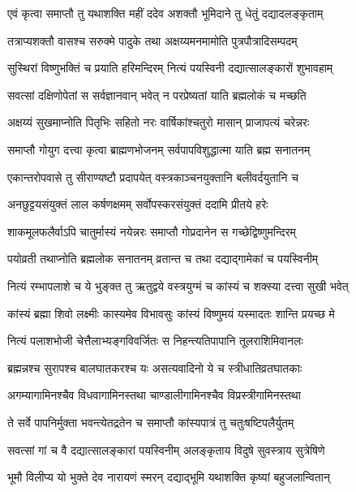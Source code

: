 \twolineshloka
{एवं कृत्वा समाप्तौ तु यथाशक्ति महीं ददेव}
{अशक्तौ भूमिदाने तु धेतुं दद्यादलङ्कृताम्} %

\twolineshloka
{तत्राप्यशक्तौ वासश्च सरुक्मे पादुके तथा}
{अक्षय्यमनमामोति पुत्रपौत्रादिसम्पदम्} %

\twolineshloka
{सुस्थिरां विष्णुभक्तिं च प्रयाति हरिमन्दिरम्}
{नित्यं पयस्विनी दद्यात्सालङ्कारों शुभावहाम्} %

\twolineshloka
{सवत्सां दक्षिणोपेतां स सर्वज्ञानवान् भवेत्}
{न परप्रेष्यतां याति ब्रह्मलोकं च मच्छति} %

\twolineshloka
{अक्षय्यं सुखमाप्नोति पितृभिः सहितो नरः}
{वार्षिकांश्चतुरो मासान् प्राजापत्यं चरेन्नरः} %

\twolineshloka
{समाप्तौ गोयुग दत्त्वा कृत्वा ब्राह्मणभोजनम्}
{सर्वपापविशुद्धात्मा याति ब्रह्म सनातनम्} %

\twolineshloka
{एकान्तरोपवासे तु सीराण्यष्टौ प्रदापयेत्}
{वस्त्रकाञ्चनयुक्तानि बलीवर्दयुतानि च} %

\twolineshloka
{अनछुट्टयसंयुक्तं लाल कर्षणक्षमम्}
{सर्वोपस्करसंयुक्तं ददामि प्रीतये हरेः} %

\twolineshloka
{शाकमूलफलैर्वाऽपि चातुर्मास्यं नयेन्नरः}
{समाप्तौ गोप्रदानेन स गच्छेद्विष्णुमन्दिरम्} %

\twolineshloka
{पयोव्रती तथाप्नोति ब्रह्मलोक सनातनम्}
{व्रतान्त च तथा दद्याद्गामेकां च पयस्विनीम्} %

\twolineshloka
{नित्यं रम्भापलाशे च ये भुङ्क्त तु ऋतुद्वये}
{वस्त्रयुग्मं च कांस्यं च शक्स्या दत्त्वा सुखी भवेत्} %

\twolineshloka
{कांस्यं ब्रह्मा शिवो लक्ष्मीः कास्यमेव विभावसुः}
{कांस्यं विष्णुमयं यस्मादतः शान्ति प्रयच्छ मे} %

\twolineshloka
{नित्यं पलाशभोजी चेत्तैलाभ्यङ्गविवर्जितः}
{स निहन्त्यतिपापानि तूलराशिमिवानलः} %

\twolineshloka
{ब्रह्मन्नश्च सुरापश्च बालघातकरश्च यः}
{असत्यवादिनो ये च स्त्रीधातिव्रतघातकाः} %

\twolineshloka
{अगम्यागामिनश्चैव विधवागामिनस्तथा}
{चाण्डालीगामिनश्चैव विप्रस्त्रीगामिनस्तथा} %

\twolineshloka
{ते सर्वे पापनिर्मुक्ता भवन्त्येतद्रतेन च}
{समाप्तौ कांस्यपात्रं तु चतुःषष्टिपलैर्युतम्} %

\twolineshloka
{सवत्सां गां च वै दद्यात्सालङ्कारां पयस्विनीम्}
{अलङ्कृताय विदुषे सुवस्त्राय सुत्रेषिणे} %

\twolineshloka
{भूमौ विलीप्य यो भुक्ते देव नारायणं स्मरन्}
{दद्याद्भूमि यथाशक्ति कृष्यां बहुजलान्वितान्} %


